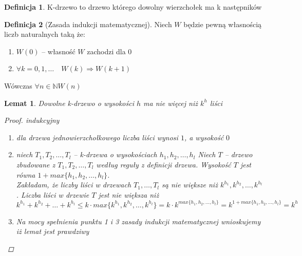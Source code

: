 \documentclass[12pt,a4paper]{article}
\newtheorem{lemat}{Lemat}
\theoremstyle{definition}
\newtheorem{df}{Definicja}
\begin{document}
	\begin{df}
		K-drzewo to drzewo którego dowolny wierzchołek ma k następników
	\end{df}
	
	\begin{df}[Zasada indukcji matematycznej]
		Niech $W$ będzie pewną własnością liczb naturalnych taką że:
		\begin{enumerate}
			\item $W(0)$ -- własność $W$ zachodzi dla $0$
			\item $\forall k=0, 1, \dots \quad W(k) \Rightarrow W(k+1)$ 
		\end{enumerate}
		Wówczas $\forall n \in \mathbb{N} W(n)$
	\end{df}
	
	\begin{lemat}
		Dowolne k-drzewo o wysokości $h$ ma nie więcej niż $k^h$ liści
		\begin{proof} \emph{indukcyjny}\\
			\begin{enumerate}
				\item dla drzewa jednowierzchołkowego liczba liści wynosi $1$, a wysokość $0$
				\item niech $T_1, T_2, \dots, T_l$ -- k-drzewa o wysokościach $h_1, h_2, \dots, h_l$
				Niech $T$ -- drzewo zbudowane z $T_1, T_2, \dots, T_l$ według reguły z definicji drzewa. 
				Wysokość $T$ jest równa $1 + max\{h_1, h_2, \dots, h_l\}$.\\
				Zakładam, że liczby liści w drzewach $T_1, \dots, T_l$ są nie większe niż $k^{h_1}, k^{h_2}, \dots, k^{h_l}$. 
				Liczba liści w drzewie $T$ jest nie większa niż 
				$$k^{h_1} + k^{h_2} + \dots + k^{h_l} \leqslant k\cdot max\{k^{h_1}, k^{h_2}, \dots, k^{h_l}\} = k\cdot k^{max\{h_1, h_2, \dots, h_l\}} 
				= k^{1 + max\{h_1, h_2, \dots, h_l\}} = k^h$$
				\item Na mocy spełnienia punktu 1 i 3 zasady indukcji matematycznej wnioskujemy iż lemat jest prawdziwy
			\end{enumerate}
		\end{proof}
	\end{lemat}
	
\end{document}
